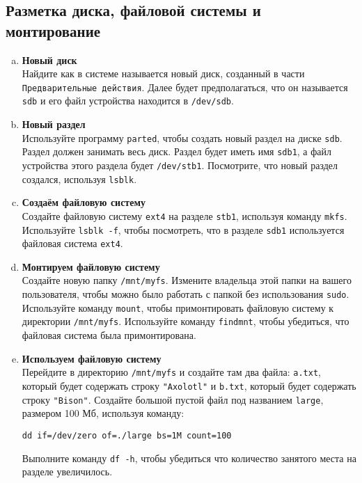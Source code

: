 \documentclass{article}
\begin{document}
\subsection{Разметка диска, файловой системы и монтирование}
\begin{enumerate}[a.]
\item \textbf{Новый диск}\\
Найдите как в системе называется новый диск, созданный в части \texttt{Предварительные действия}. Далее будет предполагаться, что он называется \texttt{sdb} и его файл устройства находится в \texttt{/dev/sdb}.

\item \textbf{Новый раздел}\\
Используйте программу \texttt{parted}, чтобы создать новый раздел на диске \texttt{sdb}. Раздел должен занимать весь диск. Раздел будет иметь имя \texttt{sdb1}, а файл устройства этого раздела будет \texttt{/dev/stb1}. Посмотрите, что новый раздел создался, используя \texttt{lsblk}.

\item \textbf{Создаём файловую систему}\\
Создайте файловую систему \texttt{ext4} на разделе \texttt{stb1}, используя команду \texttt{mkfs}. Используйте \texttt{lsblk -f}, чтобы посмотреть, что в разделе \texttt{sdb1} используется файловая система \texttt{ext4}.

\item \textbf{Монтируем файловую систему}\\
Создайте новую папку \texttt{/mnt/myfs}. Измените владельца этой папки на вашего пользователя, чтобы можно было работать с папкой без использования \texttt{sudo}. Используйте команду \texttt{mount}, чтобы примонтировать файловую систему к директории \texttt{/mnt/myfs}. Используйте команду \texttt{findmnt}, чтобы убедиться, что файловая система была примонтирована.

\item \textbf{Используем файловую систему}\\
Перейдите в директорию \texttt{/mnt/myfs} и создайте там два файла: \texttt{a.txt}, который будет содержать строку \texttt{"Axolotl"} и \texttt{b.txt}, который будет содержать строку \texttt{"Bison"}. Создайте большой пустой файл под названием \texttt{large}, размером 100 Мб, используя команду:
\begin{lstlisting}
dd if=/dev/zero of=./large bs=1M count=100
\end{lstlisting}
Выполните команду \texttt{df -h}, чтобы убедиться что количество занятого места на разделе увеличилось.


\end{enumerate}
\end{document}
